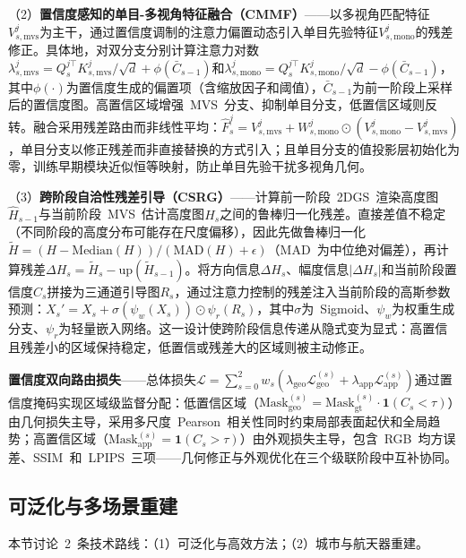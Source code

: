 （2）\textbf{置信度感知的单目-多视角特征融合（CMMF）}——以多视角匹配特征$V_{s,\text{mvs}}^j$为主干，通过置信度调制的注意力偏置动态引入单目先验特征$V_{s,\text{mono}}^j$的残差修正。具体地，对双分支分别计算注意力对数$\lambda_{s,\text{mvs}}^j = Q_s^{j\top}K_{s,\text{mvs}}^j/\sqrt{d} + \phi(\bar{C}_{s-1})$和$\lambda_{s,\text{mono}}^j = Q_s^{j\top}K_{s,\text{mono}}^j/\sqrt{d} - \phi(\bar{C}_{s-1})$，其中$\phi(\cdot)$为置信度生成的偏置项（含缩放因子和阈值），$\bar{C}_{s-1}$为前一阶段上采样后的置信度图。高置信区域增强~MVS~分支、抑制单目分支，低置信区域则反转。融合采用残差路由而非线性平均：$\hat{F}_s^j = V_{s,\text{mvs}}^j + W_{s,\text{mono}}^j \odot (V_{s,\text{mono}}^j - V_{s,\text{mvs}}^j)$，单目分支以修正残差而非直接替换的方式引入；且单目分支的值投影层初始化为零，训练早期模块近似恒等映射，防止单目先验干扰多视角几何。

（3）\textbf{跨阶段自洽性残差引导（CSRG）}——计算前一阶段~2DGS~渲染高度图$\hat{H}_{s-1}$与当前阶段~MVS~估计高度图$H_s$之间的鲁棒归一化残差。直接差值不稳定（不同阶段的高度分布可能存在尺度偏移），因此先做鲁棒归一化$\tilde{H} = (H - \text{Median}(H))/(\text{MAD}(H) + \epsilon)$（MAD~为中位绝对偏差），再计算残差$\Delta H_s = \tilde{H}_s - \text{up}(\tilde{H}_{s-1})$。将方向信息$\Delta H_s$、幅度信息$|\Delta H_s|$和当前阶段置信度$C_s$拼接为三通道引导图$R_s$，通过注意力控制的残差注入当前阶段的高斯参数预测：$X_s' = X_s + \sigma(\psi_w(X_s)) \odot \psi_r(R_s)$，其中$\sigma$为~Sigmoid、$\psi_w$为权重生成分支、$\psi_r$为轻量嵌入网络。这一设计使跨阶段信息传递从隐式变为显式：高置信且残差小的区域保持稳定，低置信或残差大的区域则被主动修正。

\textbf{置信度双向路由损失}——总体损失$\mathcal{L} = \sum_{s=0}^{2} w_s(\lambda_{\text{geo}}\mathcal{L}_{\text{geo}}^{(s)} + \lambda_{\text{app}}\mathcal{L}_{\text{app}}^{(s)})$通过置信度掩码实现区域级监督分配：低置信区域（$\text{Mask}_{\text{geo}}^{(s)} = \text{Mask}_{\text{gt}}^{(s)} \cdot \mathbf{1}(C_s < \tau)$）由几何损失主导，采用多尺度~Pearson~相关性同时约束局部表面起伏和全局趋势；高置信区域（$\text{Mask}_{\text{app}}^{(s)} = \mathbf{1}(C_s > \tau)$）由外观损失主导，包含~RGB~均方误差、SSIM~和~LPIPS~三项——几何修正与外观优化在三个级联阶段中互补协同。

\subsection{可泛化与多场景重建}
\label{ss:20_2}

本节讨论~2~条技术路线：（1）可泛化与高效方法；（2）城市与航天器重建。

